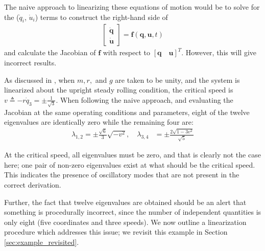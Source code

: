 \documentclass[smallcondensed,final]{svjour3}                     %
\begin{document}
The naive approach to linearizing these equations of motion would be to solve
for the ($\dot{q}_i$, $\dot{u}_i$) terms to construct the right-hand side of
\begin{align}
\begin{bmatrix}\dot{\mathbf{q}} \\ \dot{\mathbf{u}}\end{bmatrix} =
    \mathbf{f}(\mathbf{q}, \mathbf{u}, t)
\end{align}
and calculate the Jacobian of $\mathbf{f}$ with respect to $[\mathbf{q} \quad
\mathbf{u}]^T$. However, this will give incorrect results.

As discussed in \cite{Schwab2003}, when $m, r,$ and $g$ are taken to be unity,
and the system is linearized about the upright steady rolling condition, the
critical speed is $v \triangleq -r\dot{q}_3 =\pm\frac{1}{\sqrt{3}}$. When
following the naive approach, and evaluating the Jacobian at the same operating
conditions and parameters, eight of the twelve eigenvalues are identically zero
while the remaining four are:
\begin{align}
  \label{eq:evals_incorrect}
  \lambda_{1,2}=\pm\frac{\sqrt{6}}{3}\sqrt{-v^2},
  \quad \lambda_{3,4} &= \pm \frac{2\sqrt{1 - 3v^2}}{\sqrt{5}}
\end{align}

At the critical speed, all eigenvalues must be zero, and that is clearly not
the case here; one pair of non-zero eigenvalues exist at what should be the
critical speed. This indicates the presence of oscillatory modes that are not
present in the correct derivation.

Further, the fact that twelve eigenvalues are obtained should be an alert that
something is procedurally incorrect, since the number of independent quantities
is only eight (five coordinates and three speeds). We now outline a
linearization procedure which addresses this issue; we revisit this example in
Section
\ref{sec:example_revisited}.
\end{document}
